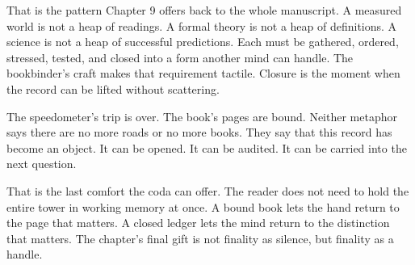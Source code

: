 That is the pattern Chapter 9 offers back to the whole manuscript. A measured
world is not a heap of readings. A formal theory is not a heap of definitions.
A science is not a heap of successful predictions. Each must be gathered,
ordered, stressed, tested, and closed into a form another mind can handle. The
bookbinder's craft makes that requirement tactile. Closure is the moment when
the record can be lifted without scattering.

The speedometer's trip is over. The book's pages are bound. Neither metaphor
says there are no more roads or no more books. They say that this record has
become an object. It can be opened. It can be audited. It can be carried into
the next question.

That is the last comfort the coda can offer. The reader does not need to hold
the entire tower in working memory at once. A bound book lets the hand return
to the page that matters. A closed ledger lets the mind return to the
distinction that matters. The chapter's final gift is not finality as silence,
but finality as a handle.
